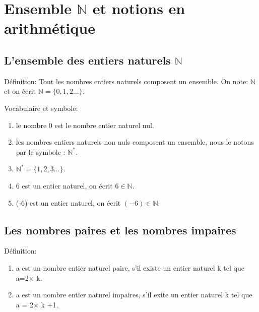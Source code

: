 \documentclass[12pt,a4paper]{book}
\begin{document}
\chapter{Ensemble $\mathbb{N}$ et notions en arithmétique}
 \section{L'ensemble des entiers naturels $\mathbb{N}$}
\begin{tcolorbox}[colback=col3,colframe=col4,leftrule=5pt,toprule=0pt,rightrule=0pt,bottomrule=0pt,arc=0pt,outer arc=0pt,top=12pt]


\large Définition:
Tout les nombres entiers naturels composent un ensemble. On note: $\mathbb{N}$ et on écrit $\mathbb{N} = \{0,1,2... \}$.

\end{tcolorbox}

\begin{tcolorbox}[colback=col6,colframe=col7,leftrule=5pt,toprule=0pt,rightrule=0pt,bottomrule=0pt,arc=0pt,outer arc=0pt,top=12pt]

\large Vocabulaire et symbole:
    \begin{enumerate}[label=\textbullet]

\item le nombre 0 est le nombre entier naturel nul.
\item les nombres entiers naturels non nuls composent un ensemble, nous le notons par le symbole : $\mathbb{N}^*$.
\item $\mathbb{N^*} =\{1,2,3...\}$.
\item  6 est un entier naturel, on écrit  $6\in \mathbb{N}$.
\item (-6) est un entier naturel, on écrit  $(-6)\in \mathbb{N}$.
 
   \end{enumerate}
\end{tcolorbox}

\section{Les nombres paires et les nombres impaires }

\begin{tcolorbox}[colback=col3,colframe=col4,leftrule=5pt,toprule=0pt,rightrule=0pt,bottomrule=0pt,arc=0pt,outer arc=0pt,top=12pt]


\large Définition:
\begin{enumerate}[label=\textbullet]
    \item a est un nombre entier naturel paire, s'il existe un entier naturel k tel que a=2$\times$ k.
    
     \item a est un nombre entier naturel impaires, s'il exite un entier naturel k tel que a = 2$\times$ k +1.
    
\end{enumerate}
\end{tcolorbox}
\end{document}
